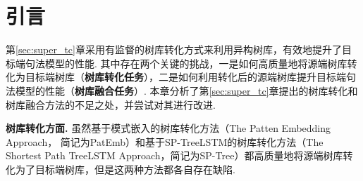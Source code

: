 \section{引言}
第\ref{sec:super_tc}章采用有监督的树库转化方式来利用异构树库，有效地提升了目标端句法模型的性能. 其中存在两个关键的挑战，一是如何高质量地将源端树库转化为目标端树库（\textbf{树库转化任务}），二是如何利用转化后的源端树库提升目标端句法模型的性能（\textbf{树库融合任务}）. 本章分析了第\ref{sec:super_tc}章提出的树库转化和树库融合方法的不足之处，并尝试对其进行改进.

\textbf{树库转化方面.  } 虽然基于模式嵌入的树库转化方法（The Patten Embedding Approach， 简记为PatEmb）和基于SP-TreeLSTM的树库转化方法（The Shortest Path TreeLSTM Approach，简记为SP-Tree）都高质量地将源端树库转化为了目标端树库，但是这两种方法都各自存在缺陷.

